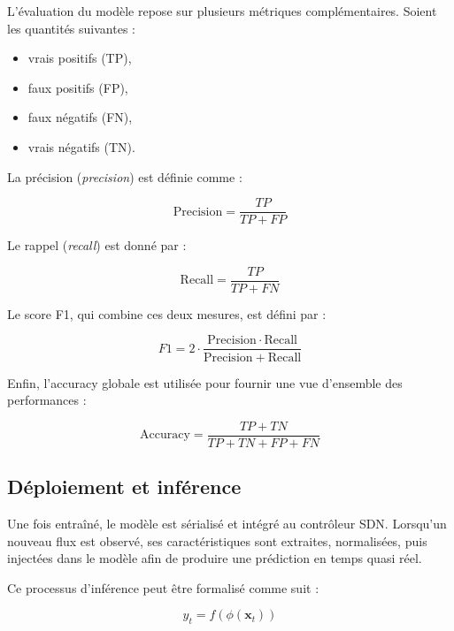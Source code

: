 \documentclass[11pt]{article}
\begin{document}
L’évaluation du modèle repose sur plusieurs métriques complémentaires. Soient les quantités suivantes :

\begin{itemize}
    \item vrais positifs (TP),
    \item faux positifs (FP),
    \item faux négatifs (FN),
    \item vrais négatifs (TN).
\end{itemize}

La précision (\textit{precision}) est définie comme :

\begin{equation}
\mathrm{Precision} = \frac{TP}{TP + FP}
\end{equation}

Le rappel (\textit{recall}) est donné par :

\begin{equation}
\mathrm{Recall} = \frac{TP}{TP + FN}
\end{equation}

Le score F1, qui combine ces deux mesures, est défini par :

\begin{equation}
F1 = 2 \cdot \frac{\mathrm{Precision} \cdot \mathrm{Recall}}{\mathrm{Precision} + \mathrm{Recall}}
\end{equation}

Enfin, l’accuracy globale est utilisée pour fournir une vue d’ensemble des performances :

\begin{equation}
\mathrm{Accuracy} = \frac{TP + TN}{TP + TN + FP + FN}
\end{equation}

\subsection{Déploiement et inférence}

Une fois entraîné, le modèle est sérialisé et intégré au contrôleur SDN. Lorsqu’un nouveau flux est observé, ses caractéristiques sont extraites, normalisées, puis injectées dans le modèle afin de produire une prédiction en temps quasi réel.

Ce processus d’inférence peut être formalisé comme suit :

\begin{equation}
\hat{y}_t = f(\phi(\mathbf{x}_t))
\end{equation}
\end{document}
